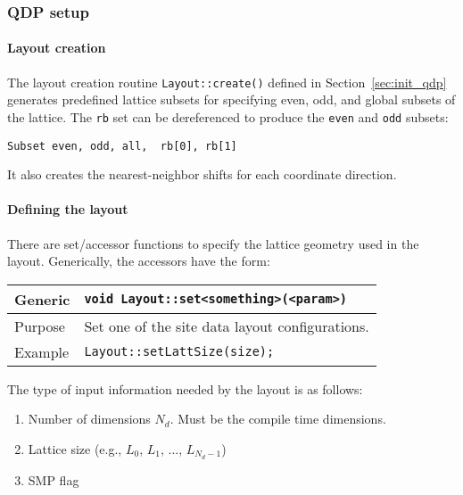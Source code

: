 \documentclass[12pt,letterpaper]{article}
\begin{document}
\subsubsection{QDP setup}

\paragraph{Layout creation}
\mbox{}

\noindent
The layout creation routine \verb|Layout::create()| defined in
Section~\ref{sec:init_qdp} generates predefined lattice subsets for
specifying even, odd, and global subsets of the lattice. The \verb|rb|
set can be dereferenced to produce the \verb|even| and \verb|odd| subsets:
%
\begin{verbatim}
Subset even, odd, all,  rb[0], rb[1]
\end{verbatim}
%
It also creates the nearest-neighbor shifts for each coordinate
direction.

\paragraph{Defining the layout}
\mbox{}

\noindent
There are set/accessor functions to specify the lattice geometry used
in the layout. Generically, the accessors have the form:

\begin{flushleft}
  \begin{tabular}{|l|l|}
  \hline
  Generic      & \verb|void Layout::set<something>(<param>)|\\
  \hline
  Purpose      & Set one of the site data layout configurations. \\
\hline
  Example  & \verb|Layout::setLattSize(size);| \\
   \hline
 \end{tabular}
\end{flushleft}

The type of input information needed by the layout is as follows:
\begin{enumerate}
\item	Number of dimensions $N_d$. Must be the compile time dimensions.
\item	Lattice size  (e.g., $L_0$, $L_1$, ..., $L_{N_d-1}$)
\item	SMP flag
\end{enumerate}
\end{document}
